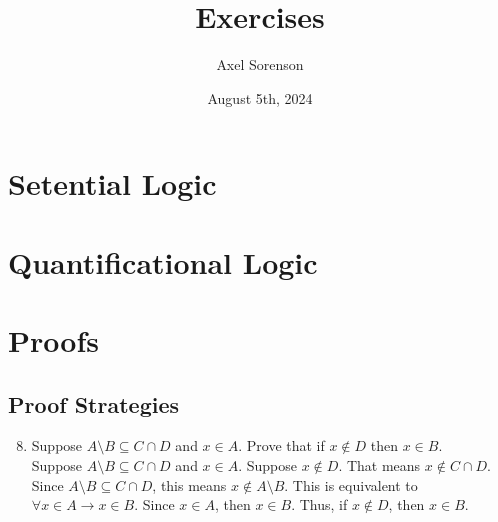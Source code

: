 \documentclass{article}
\title{Exercises}
\author{Axel Sorenson}
\date{August 5th, 2024}
\begin{document}
\maketitle
\section{Setential Logic}
\section{Quantificational Logic}
\section{Proofs}
\subsection{Proof Strategies}
\begin{enumerate}
\setcounter{enumi}{7} 
\item Suppose $A \setminus B \subseteq C \cap D$ and $x \in A$. Prove that if $x \notin D$ then $x \in B$.\\

    \noindent Suppose $A \setminus B \subseteq C \cap D$ and $x \in A$. Suppose $x \notin D$. That means $x \notin C \cap D$. Since $A \setminus B \subseteq C \cap D$, this means $x \notin A \setminus B$. This is equivalent to $\forall x \in A \rightarrow x \in B$. Since $x \in A$, then $x \in B$. Thus, if $x \notin D$, then $x \in B$.

\end{enumerate}
\end{document}
